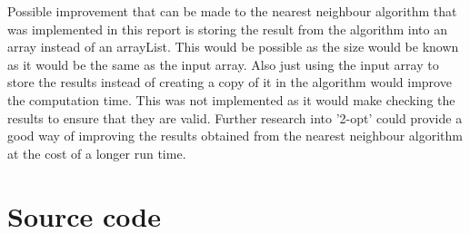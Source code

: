 \documentclass[conference,backref=page]{acmsiggraph}
\begin{document}
Possible improvement that can be made to the nearest neighbour algorithm that was implemented in this report is storing the result from the algorithm into an array instead of an arrayList. This would be possible as the size would be known as it would be the same as the input array. Also just using the input array to store the results instead of creating a copy of it in the algorithm would improve the computation time. This was not implemented as it would make checking the results to ensure that they are valid. Further research into '2-opt' could provide a good way of improving the results obtained from the nearest neighbour algorithm at the cost of a longer run time.

\section{Source code}
\end{document}

